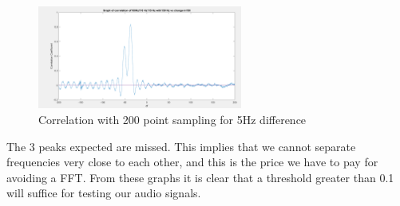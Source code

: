 \begin{figure}[ht]
    \centering
    \includegraphics[width=0.6\textwidth]{fig/LowResolutionGraph3200ots.PNG}
    \caption{Correlation with 200 point sampling for 5Hz difference}
    \label{fig:200ptslowres}
\end{figure}
The 3 peaks expected are missed. This implies that we cannot separate frequencies very close to each other, and this is the price we have to pay for avoiding a FFT. From these graphs it is clear that a threshold greater than 0.1 will suffice for testing our audio signals. 


